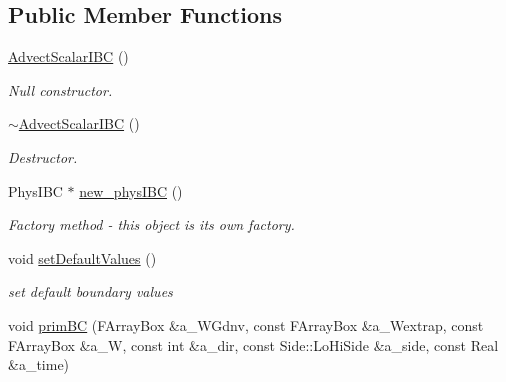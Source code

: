\subsection*{Public Member Functions}
\begin{DoxyCompactItemize}
\item 
\hypertarget{class_advect_scalar_i_b_c_a8a7d71ac27efd7518f8030258c77ca9c}{\hyperlink{class_advect_scalar_i_b_c_a8a7d71ac27efd7518f8030258c77ca9c}{Advect\-Scalar\-I\-B\-C} ()}\label{class_advect_scalar_i_b_c_a8a7d71ac27efd7518f8030258c77ca9c}

\begin{DoxyCompactList}\small\item\em Null constructor. \end{DoxyCompactList}\item 
\hypertarget{class_advect_scalar_i_b_c_a61c69ace6846f913e373c1d5722205a4}{\hyperlink{class_advect_scalar_i_b_c_a61c69ace6846f913e373c1d5722205a4}{$\sim$\-Advect\-Scalar\-I\-B\-C} ()}\label{class_advect_scalar_i_b_c_a61c69ace6846f913e373c1d5722205a4}

\begin{DoxyCompactList}\small\item\em Destructor. \end{DoxyCompactList}\item 
Phys\-I\-B\-C $\ast$ \hyperlink{class_advect_scalar_i_b_c_ade97942777fcd8c9ace4331a97bfd409}{new\-\_\-phys\-I\-B\-C} ()
\begin{DoxyCompactList}\small\item\em Factory method -\/ this object is its own factory. \end{DoxyCompactList}\item 
\hypertarget{class_advect_scalar_i_b_c_a3fc16f89f62ecd72e72edf4b877f52c2}{void \hyperlink{class_advect_scalar_i_b_c_a3fc16f89f62ecd72e72edf4b877f52c2}{set\-Default\-Values} ()}\label{class_advect_scalar_i_b_c_a3fc16f89f62ecd72e72edf4b877f52c2}

\begin{DoxyCompactList}\small\item\em set default boundary values \end{DoxyCompactList}\item 
\hypertarget{class_advect_scalar_i_b_c_ae6171f558bf33f3760594d5f886f676e}{void \hyperlink{class_advect_scalar_i_b_c_ae6171f558bf33f3760594d5f886f676e}{prim\-B\-C} (F\-Array\-Box \&a\-\_\-\-W\-Gdnv, const F\-Array\-Box \&a\-\_\-\-Wextrap, const F\-Array\-Box \&a\-\_\-\-W, const int \&a\-\_\-dir, const Side\-::\-Lo\-Hi\-Side \&a\-\_\-side, const Real \&a\-\_\-time)}\label{class_advect_scalar_i_b_c_ae6171f558bf33f3760594d5f886f676e}


\end{DoxyCompactItemize}

